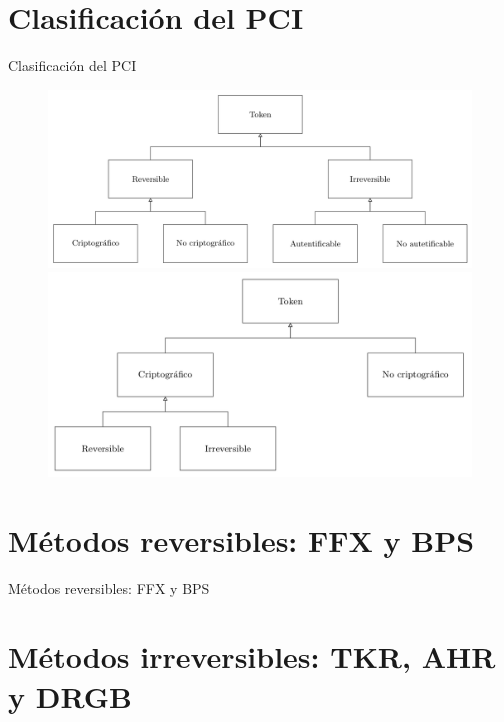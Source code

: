 \documentclass{beamer}
\begin{document}
  \section{Clasificación del PCI}

  \begin{frame}{Clasificación del PCI}
    \begin{figure}[H]
      \begin{center}
        \includegraphics[width=0.8\linewidth]
          {presentacion_rci/diagramas/clasificacion_pci.png}
        \newline
        \newline
        \includegraphics[width=0.8\linewidth]
          {presentacion_rci/diagramas/clasificacion_propia.png}
      \end{center}
    \end{figure}
  \end{frame}

  \section{Métodos reversibles: FFX y BPS}

  \begin{frame}{Métodos reversibles: FFX y BPS}

  \end{frame}

  \section{Métodos irreversibles: TKR, AHR y DRGB}
\end{document}
